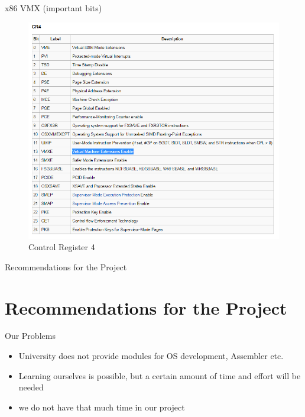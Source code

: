 \documentclass[11pt, aspectratio=169, modernfonts]{beamer}
\theoremstyle{definition}
\theoremstyle{remark}
\begin{document}
\begin{frame}{x86 VMX (important bits)}
    \begin{figure}
        \centering
        \includegraphics[scale = 0.33]{graphics/CR4.PNG}
        \caption{Control Register 4\cite{cr4}}
        \label{fig:my_label}
    \end{figure}
\end{frame}

\begin{frame}{Recommendations for the Project}
    \section{Recommendations for the Project}
    \begin{block}{Our Problems}
        \begin{itemize}
        \item University does not provide modules for OS development, Assembler etc.
        \item Learning ourselves is possible, but a certain amount of time and effort will be needed
        \item we do not have that much time in our project
    \end{itemize}
    \end{block}
\end{frame}
\end{document}
